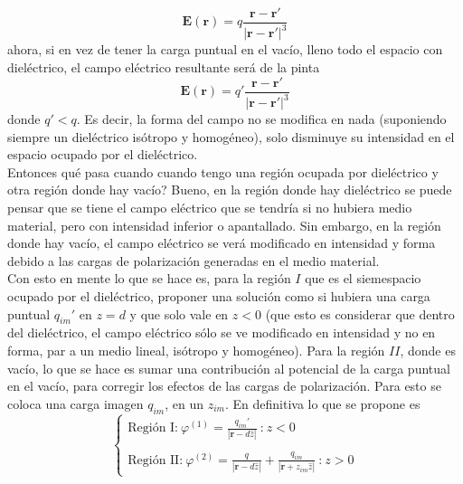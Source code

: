 \begin{equation*}
    \textbf{E}(\textbf{r}) = q\frac{\textbf{r}-\textbf{r}'}{|\textbf{r}-\textbf{r}'|^{3}}
\end{equation*}
ahora, si en vez de tener la carga puntual en el vacío, lleno todo el espacio con dieléctrico, el campo eléctrico resultante será de la pinta
\begin{equation*}
    \textbf{E}(\textbf{r}) = q'
    \frac{\textbf{r}-\textbf{r}'}{|\textbf{r}-\textbf{r}'|^{3}}
\end{equation*}
donde $q' < q$. Es decir, la forma del campo no se modifica en nada (suponiendo siempre un dieléctrico isótropo y homogéneo), solo disminuye su intensidad en el espacio ocupado por el dieléctrico.\\
\indent Entonces qué pasa cuando cuando tengo una región ocupada por dieléctrico y otra región donde hay vacío? Bueno, en la región donde hay dieléctrico se puede pensar que se tiene el campo eléctrico que se tendría si no hubiera medio material, pero con intensidad inferior o apantallado. Sin embargo, en la región donde hay vacío, el campo eléctrico se verá modificado en intensidad y forma debido a las cargas de polarización generadas en el medio material.\\
\indent Con esto en mente lo que se hace es, para la región $I$ que es el siemespacio ocupado por el dieléctrico, proponer una solución como si hubiera una carga puntual $q_{im}'$ en $z = d$ y que solo vale en $z < 0$ (que esto es considerar que dentro del dieléctrico, el campo eléctrico sólo se ve modificado en intensidad y no en forma, par a un medio lineal, isótropo y homogéneo). Para la región $II$, donde es vacío, lo que se hace es sumar una contribución al potencial de la carga puntual en el vacío, para corregir los efectos de las cargas de polarización. Para esto se coloca una carga imagen $q_{im}$, en un $z_{im}$. En definitiva lo que se propone es
\begin{equation*}
    \left\{
        \begin{matrix}
            \mbox{Región I:}\ 
            \varphi^{(1)} = \frac{q_{im}'}{|\textbf{r}-d\hat{z}|}\ \mbox{:}\ z < 0\\
            \\
            \mbox{Región II:}\ 
            \varphi^{(2)} = 
            \frac{q}{|\textbf{r}-d\hat{z}|} +
            \frac{q_{im}}{|\textbf{r}+z_{im}\hat{z}|}\ \mbox{:}\ z > 0
        \end{matrix}
    \right.
\end{equation*}
